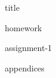 \documentclass[11pt,titlepage]{report}
\begin{document}
{title}

\clearpage
\tableofcontents

\clearpage
{}
{homework}

{assignment-1}

\clearpage
{}
\printbibliography[heading=bibintoc]

\clearpage
{}
{appendices}
\end{document}
